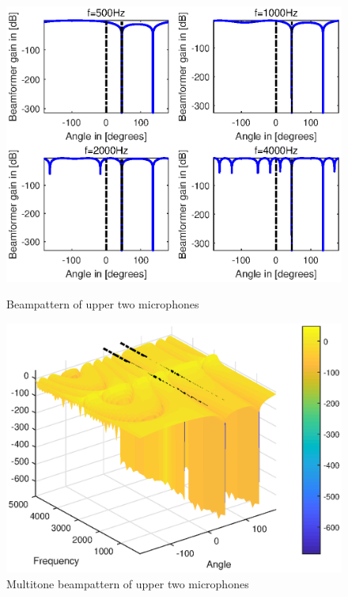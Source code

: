 \documentclass[onecolumn, conference]{IEEEtran}
\begin{document}
\begin{figure}[htbp]
	\begin{minipage}[b]{0.5\linewidth}
		\centerline{\includegraphics[width=1\textwidth]{img/1_b_2.eps}}
		\caption{Beampattern of upper two microphones}
		\label{Beampattern of upper two microphones45}
	\end{minipage}
	\hfill
	\begin{minipage}[b]{0.5\linewidth}
		\centerline{\includegraphics[width=1\textwidth]{img/1_a_2_multi_45.eps}}
		\caption{Multitone beampattern of upper two microphones}
		\label{Multitone beampattern of upper two microphones45}
	\end{minipage}
\end{figure}
\end{document}
